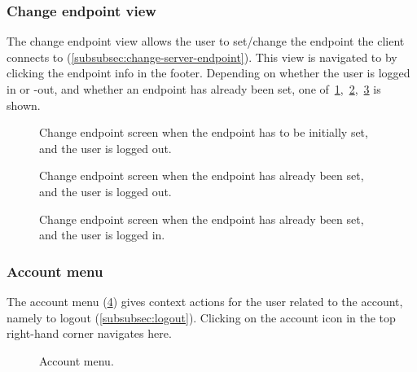 \subsubsection{Change endpoint view}
The change endpoint view allows the user to set/change the endpoint the client connects to (\ref{subsubsec:change-server-endpoint}).
This view is navigated to by clicking the endpoint info in the footer. \newline
Depending on whether the user is logged in or -out, and whether an endpoint has already been set, one of~\ref{fig:ex-change-endpoint-view-none-logged-out},~\ref{fig:ex-change-endpoint-view-present-logged-out},~\ref{fig:ex-change-endpoint-view-present-logged-in} is shown.
\begin{figure}
    \centering

    \caption{Change endpoint screen when the endpoint has to be initially set, and the user is logged out.}
    \label{fig:ex-change-endpoint-view-none-logged-out}
\end{figure}
\begin{figure}
    \centering

    \caption{Change endpoint screen when the endpoint has already been set, and the user is logged out.}
    \label{fig:ex-change-endpoint-view-present-logged-out}
\end{figure}
\begin{figure}
    \centering

    \caption{Change endpoint screen when the endpoint has already been set, and the user is logged in.}
    \label{fig:ex-change-endpoint-view-present-logged-in}
\end{figure}

\subsubsection{Account menu}
The account menu (\ref{fig:ex-account-menu-view}) gives context actions for the user related to the account, namely to logout (\ref{subsubsec:logout}).
Clicking on the account icon in the top right-hand corner navigates here.

\begin{figure}
    \centering

    \caption{Account menu.}
    \label{fig:ex-account-menu-view}
\end{figure}

